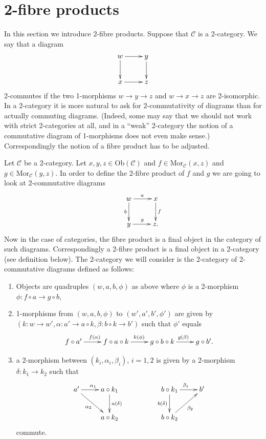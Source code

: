 \section{2-fibre products}
\label{section-2-fibre-products}

\noindent
In this section we introduce $2$-fibre products. Suppose that $\mathcal{C}$
is a 2-category. We say that a diagram
$$
\xymatrix{
w \ar[r] \ar[d] & y \ar[d] \\
x \ar[r] & z }
$$
2-commutes if the two 1-morphisms $w \to y \to z$ and $w \to x \to z$ are
2-isomorphic. In a 2-category it is more natural to ask for 2-commutativity 
of diagrams than for actually commuting diagrams. (Indeed, some may say that
we should not work with strict 2-categories at all, and in a ``weak''
2-category the notion of a commutative diagram of 1-morphisms does not even
make sense.) Correspondingly the notion of a fibre product has to be adjusted.

\medskip\noindent
Let $\mathcal{C}$ be a $2$-category. Let $x,y,z\in \text{Ob}(\mathcal{C})$ and
$f\in \text{Mor}_{\mathcal{C}}(x,z)$ and $g\in \text{Mor}_{\mathcal C}(y,z)$.
In order to define the 2-fibre product of $f$ and $g$ we are going to look at
2-commutative diagrams
$$
\xymatrix{
&w \ar[r]^{a} \ar[d]_{b} & x \ar[d]^{f} \\
&y \ar[r]^{g} & z. }
$$
Now in the case of categories, the fibre product is a final object in the
category of such diagrams. Correspondingly a 2-fibre product is a final object
in a 2-category (see definition below). The 2-category we will consider is
the 2-category of 2-commutative diagrams defined as follows:
\begin{enumerate}
\item Objects are quadruples $(w,a,b,\phi)$ as above where $\phi$
is a 2-morphism $\phi : f \circ a \to g \circ b$, 
\item 1-morphisms from $(w,a,b,\phi)$ to $(w',a',b',\phi')$
are given by $(k : w \to w', \alpha : a' \to a \circ k,
\beta : b \circ k \to b')$ such that $\phi'$ equals 
$$
\xymatrix{
f \circ a' \ar[r]^{f(\alpha)} &
f \circ a \circ k \ar[r]^{k(\phi)} &
g \circ b \circ k \ar[r]^{g(\beta)} &
g \circ b'. }
$$
\item a 2-morphism between $(k_i, \alpha_i, \beta_i)$, $i=1,2$ is given
by a 2-morphism $\delta : k_1 \to k_2$ such that 
$$
\xymatrix{
a' \ar[rd]_{\alpha_2} \ar[r]^{\alpha_1} & 
a \circ k_1 \ar[d]^{a(\delta)} &
&
b \circ k_1 \ar[r]^{\beta_1} \ar[d]_{b(\delta)} &
b'
\\
&
a \circ k_2 &
&
b \circ k_2 \ar[ru]_{\beta_2}
&
}
$$
commute.
\end{enumerate}

